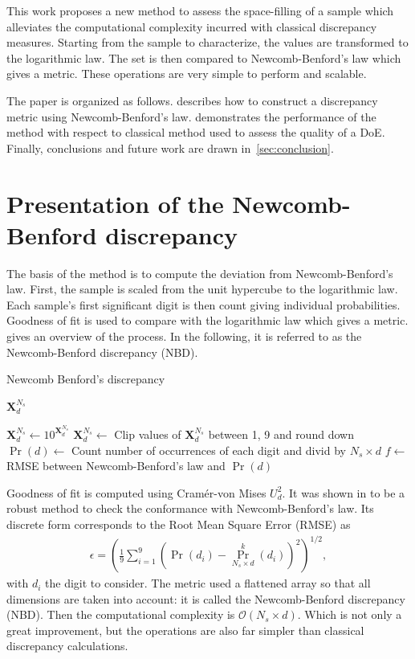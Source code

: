 \documentclass[1p]{elsarticle}
\begin{document}
This work proposes a new method to assess the space-filling of a sample which alleviates the computational complexity incurred with classical discrepancy measures. Starting from the sample to characterize, the values are transformed to the logarithmic law. The set is then compared to Newcomb-Benford's law which gives a metric. These operations are very simple to perform and scalable.

The paper is organized as follows.  describes how to construct a discrepancy metric using Newcomb-Benford's law.  demonstrates the performance of the method with respect to classical method used to assess the quality of a DoE.
Finally, conclusions and future work are drawn in~\cref{sec:conclusion}.


\section{Presentation of the Newcomb-Benford discrepancy} \label{sec:method}

The basis of the method is to compute the deviation from Newcomb-Benford's law. First, the sample is scaled from the unit hypercube to the logarithmic law. Each sample's first significant digit is then count giving individual probabilities. Goodness of fit is used to compare with the logarithmic law which gives a metric.  gives an overview of the process. In the following, it is referred to as the Newcomb-Benford discrepancy (NBD). 

\begin{algorithm}
  \caption{Newcomb Benford's discrepancy}
  \label{alg:nbd}
  \begin{algorithmic}[1]
  \Require $\mathbf{X}^{N_s}_d$
  
  \State $\mathbf{X}^{N_s}_d \gets 10^{\mathbf{X}^{N_s}_d}$ 
  \State $\mathbf{X}^{N_s}_d \gets$ Clip values of $\mathbf{X}^{N_s}_d$ between 1, 9 and round down
  \State $\Pr(d) \gets$ Count number of occurrences of each digit and divid by $N_s \times d$
  \State $f \gets$ RMSE between Newcomb-Benford's law and $\Pr(d)$

  \end{algorithmic}
\end{algorithm}

Goodness of fit is computed using Cramér-von Mises $U_d^2$. It was shown in \citep{Lesperance2016} to be a robust method to check the conformance with Newcomb-Benford's law. Its discrete form corresponds to the Root Mean Square Error (RMSE) as
\begin{align}
\epsilon = \left( \frac{1}{9} \displaystyle \sum_{i=1}^{9} \left(\Pr(d_i) - \Pr_{N_s\times d}^k (d_i)\right)^2 \right)^{1/2},
\end{align}
\noindent with $d_i$ the digit to consider. The metric used a flattened array so that all dimensions are taken into account: it is called the Newcomb-Benford discrepancy (NBD). Then the computational complexity is $\mathcal{O}(N_s \times d)$. Which is not only a great improvement, but the operations are also far simpler than classical discrepancy calculations.
\end{document}
